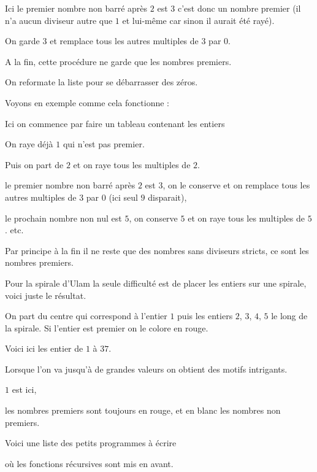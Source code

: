 Ici le premier nombre non barré après $2$ est $3$ c'est donc un nombre premier
(il n'a aucun diviseur autre que $1$ et lui-même car sinon il aurait été rayé).

On garde $3$ et remplace tous les autres multiples de $3$ par $0$.


\change

A la fin, cette procédure ne garde que les nombres premiers.

On reformate la liste pour se débarrasser des zéros.

\change

Voyons en exemple comme cela fonctionne :

Ici on commence par faire un tableau contenant les entiers 

On raye déjà $1$ qui n'est pas premier.

\change

Puis on part de $2$ et on raye tous les multiples de $2$.

\change

le premier nombre non barré après $2$ est $3$, on le conserve et on remplace tous les autres multiples de $3$
par $0$ (ici seul $9$ disparait),

le prochain nombre non nul est $5$, on conserve $5$ et on raye tous les multiples de $5$. etc.

\change

Par principe à la fin il ne reste que des nombres sans diviseurs stricts, ce sont les nombres premiers.



\diapo

Pour la spirale d'Ulam la seule difficulté est de placer les entiers sur une spirale, voici juste
le résultat.

On part du centre qui correspond à l'entier $1$ puis les entiers 
$2$, $3$, $4$, $5$ le long de la spirale.
Si l'entier est premier on le colore en rouge. 

Voici ici les entier de $1$ à $37$.


\change

Lorsque l'on va jusqu'à de grandes valeurs 
on obtient des motifs intrigants.

$1$ est ici,

les nombres premiers sont toujours en rouge,
et en blanc les nombres non premiers.




\diapo

Voici une liste des petits programmes à écrire

où les fonctions récursives sont mis en avant.



